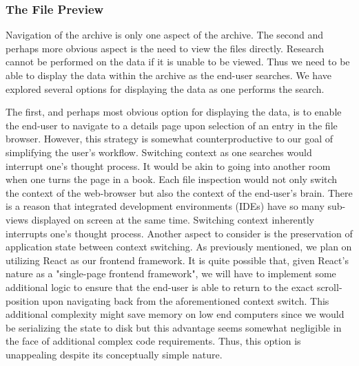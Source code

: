 \documentclass[12pt]{report}
\begin{document}
\begin{enumerate}
\subsubsection*{The File Preview}

Navigation of the archive is only one aspect of the archive. The second and perhaps more obvious aspect is the need to view the files directly. Research cannot be performed on the data if it is unable to be viewed. Thus we need to be able to display the data within the archive as the end-user searches. We have explored several options for displaying the data as one performs the search.

The first, and perhaps most obvious option for displaying the data, is to enable the end-user to navigate to a details page upon selection of an entry in the file browser. However, this strategy is somewhat counterproductive to our goal of simplifying the user's workflow. Switching context as one searches would interrupt one's thought process. It would be akin to going into another room when one turns the page in a book. Each file inspection would not only switch the context of the web-browser but also the context of the end-user's brain. There is a reason that integrated development environments (IDEs) have so many sub-views displayed on screen at the same time. Switching context inherently interrupts one's thought process. Another aspect to consider is the preservation of application state between context switching. As previously mentioned, we plan on utilizing React as our frontend framework. It is quite possible that, given React's nature as a "single-page frontend framework", we will have to implement some additional logic to ensure that the end-user is able to return to the exact scroll-position upon navigating back from the aforementioned context switch. This additional complexity might save memory on low end computers since we would be serializing the state to disk but this advantage seems somewhat negligible in the face of additional complex code requirements. Thus, this option is unappealing despite its conceptually simple nature.


\end{enumerate}
\end{document}

